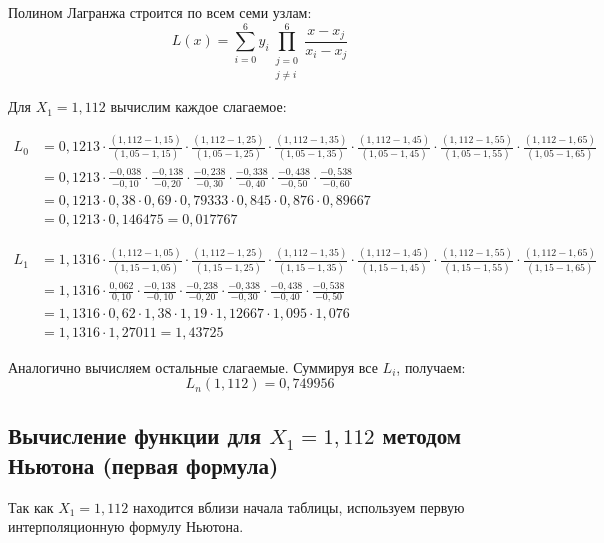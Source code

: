Полином Лагранжа строится по всем семи узлам:
\[
L(x) = \sum_{i=0}^{6} y_i \prod_{\substack{j=0 \\ j \neq i}}^{6} \frac{x - x_j}{x_i - x_j}
\]

Для $X_1 = 1{,}112$ вычислим каждое слагаемое:

\begin{align*}
L_0 &= 0{,}1213 \cdot \frac{(1{,}112-1{,}15)}{(1{,}05-1{,}15)} \cdot \frac{(1{,}112-1{,}25)}{(1{,}05-1{,}25)} \cdot \frac{(1{,}112-1{,}35)}{(1{,}05-1{,}35)} \cdot \frac{(1{,}112-1{,}45)}{(1{,}05-1{,}45)} \cdot \frac{(1{,}112-1{,}55)}{(1{,}05-1{,}55)} \cdot \frac{(1{,}112-1{,}65)}{(1{,}05-1{,}65)} \\
&= 0{,}1213 \cdot \frac{-0{,}038}{-0{,}10} \cdot \frac{-0{,}138}{-0{,}20} \cdot \frac{-0{,}238}{-0{,}30} \cdot \frac{-0{,}338}{-0{,}40} \cdot \frac{-0{,}438}{-0{,}50} \cdot \frac{-0{,}538}{-0{,}60} \\
&= 0{,}1213 \cdot 0{,}38 \cdot 0{,}69 \cdot 0{,}79333 \cdot 0{,}845 \cdot 0{,}876 \cdot 0{,}89667 \\
&= 0{,}1213 \cdot 0{,}146475 = 0{,}017767
\end{align*}

\begin{align*}
L_1 &= 1{,}1316 \cdot \frac{(1{,}112-1{,}05)}{(1{,}15-1{,}05)} \cdot \frac{(1{,}112-1{,}25)}{(1{,}15-1{,}25)} \cdot \frac{(1{,}112-1{,}35)}{(1{,}15-1{,}35)} \cdot \frac{(1{,}112-1{,}45)}{(1{,}15-1{,}45)} \cdot \frac{(1{,}112-1{,}55)}{(1{,}15-1{,}55)} \cdot \frac{(1{,}112-1{,}65)}{(1{,}15-1{,}65)} \\
&= 1{,}1316 \cdot \frac{0{,}062}{0{,}10} \cdot \frac{-0{,}138}{-0{,}10} \cdot \frac{-0{,}238}{-0{,}20} \cdot \frac{-0{,}338}{-0{,}30} \cdot \frac{-0{,}438}{-0{,}40} \cdot \frac{-0{,}538}{-0{,}50} \\
&= 1{,}1316 \cdot 0{,}62 \cdot 1{,}38 \cdot 1{,}19 \cdot 1{,}12667 \cdot 1{,}095 \cdot 1{,}076 \\
&= 1{,}1316 \cdot 1{,}27011 = 1{,}43725
\end{align*}

Аналогично вычисляем остальные слагаемые. Суммируя все $L_i$, получаем:
\[
\boxed{L_n(1{,}112) = 0{,}749956}
\]

\subsection{Вычисление функции для $X_1 = 1{,}112$ методом Ньютона (первая формула)}

Так как $X_1 = 1{,}112$ находится вблизи начала таблицы, используем первую интерполяционную формулу Ньютона.

